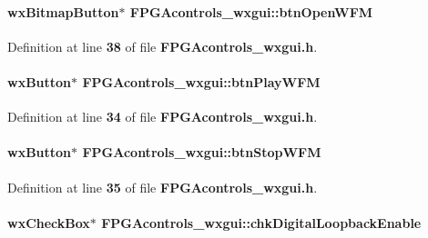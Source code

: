 \paragraph[{btn\+Open\+W\+FM}]{\setlength{\rightskip}{0pt plus 5cm}wx\+Bitmap\+Button$\ast$ F\+P\+G\+Acontrols\+\_\+wxgui\+::btn\+Open\+W\+FM}\label{classFPGAcontrols__wxgui_afa4ba20587fb991af73b141619f6fdef}


Definition at line {\bf 38} of file {\bf F\+P\+G\+Acontrols\+\_\+wxgui.\+h}.

\paragraph[{btn\+Play\+W\+FM}]{\setlength{\rightskip}{0pt plus 5cm}wx\+Button$\ast$ F\+P\+G\+Acontrols\+\_\+wxgui\+::btn\+Play\+W\+FM}\label{classFPGAcontrols__wxgui_ad87a044722d1b30fa613e6de76e9fe5b}


Definition at line {\bf 34} of file {\bf F\+P\+G\+Acontrols\+\_\+wxgui.\+h}.

\paragraph[{btn\+Stop\+W\+FM}]{\setlength{\rightskip}{0pt plus 5cm}wx\+Button$\ast$ F\+P\+G\+Acontrols\+\_\+wxgui\+::btn\+Stop\+W\+FM}\label{classFPGAcontrols__wxgui_a2de4f6522d827a87b457d95131233ed1}


Definition at line {\bf 35} of file {\bf F\+P\+G\+Acontrols\+\_\+wxgui.\+h}.

\paragraph[{chk\+Digital\+Loopback\+Enable}]{\setlength{\rightskip}{0pt plus 5cm}wx\+Check\+Box$\ast$ F\+P\+G\+Acontrols\+\_\+wxgui\+::chk\+Digital\+Loopback\+Enable}\label{classFPGAcontrols__wxgui_af4783c309def19b64e3c5f79e52e191d}


